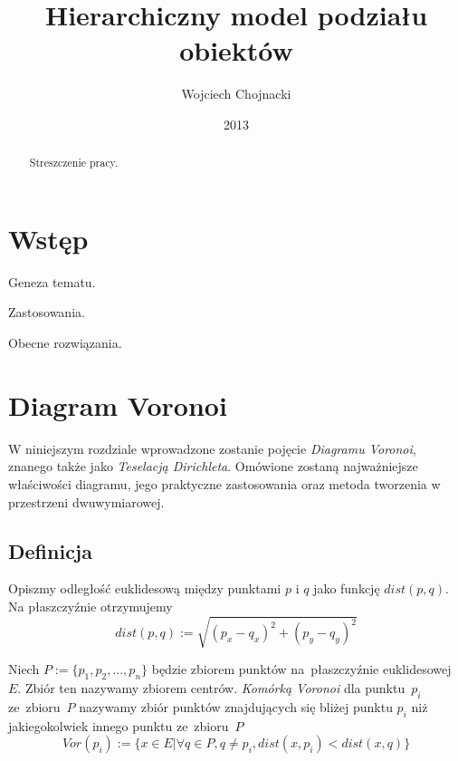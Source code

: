 \documentclass[skorowidz,autorrok,backref,xodstep,oswiadczenie]{wmimgr}
\author   {Wojciech Chojnacki}
\title    {Hierarchiczny model podziału obiektów}
\date     {2013}
\begin{document}
\nocite{*} %

\begin{abstract}

Streszczenie pracy.

\end{abstract}

\maketitle

%
%
\listoffigures

%

%
\chapter{Wstęp}

Geneza tematu.

Zastosowania.

Obecne rozwiązania.


\chapter{Diagram Voronoi}

W niniejszym rozdziale wprowadzone zostanie pojęcie \emph{Diagramu Voronoi}, znanego także jako \emph{Teselacją Dirichleta}. Omówione zostaną najważniejsze właściwości diagramu, jego praktyczne zastosowania oraz metoda tworzenia w przestrzeni dwuwymiarowej.

\section{Definicja}

Opiszmy odległość euklidesową między punktami $p$ i $q$ jako funkcję $dist(p,q)$. Na płaszczyźnie otrzymujemy
\begin{equation}
dist(p,q) := \sqrt{( p_{x} - q_{x} )^2 + (p_{y} - q_{y})^2}
\end{equation}

Niech $P:=\{ p_{1},p_{2},...,p_{n} \}$ będzie zbiorem punktów na~płaszczyźnie euklidesowej $E$. Zbiór ten nazywamy zbiorem centrów. \emph{Komórką Voronoi} dla punktu~$p_{i}$ ze~zbioru~$P$ nazywamy zbiór punktów znajdujących się bliżej punktu $p_{i}$ niż jakiegokolwiek innego punktu ze~zbioru~$P$
\begin{equation}
Vor(p_{i}) := \{ x \in E | \forall q \in P, q \neq p_{i}, dist(x,p_{i}) < dist(x,q) \}
\end{equation}
\end{document}
